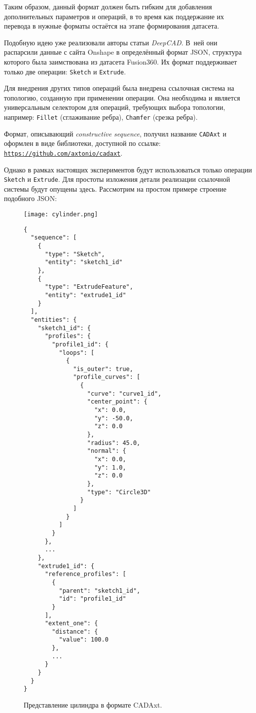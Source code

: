 Таким образом, данный формат должен быть гибким для добавления дополнительных параметров и операций,
в то время как поддержание их перевода в нужные форматы остаётся на этапе формирования датасета.

Подобную идею уже реализовали авторы статьи \textit{DeepCAD}. В~ней они распарсили данные с сайта Onshape в определённый формат JSON,
структура которого была заимствована из датасета Fusion360.
Их формат поддерживает только две операции: \texttt{Sketch} и \texttt{Extrude}.

Для внедрения других типов операций была внедрена ссылочная система на топологию, созданную при применении операции.
Она необходима и является универсальным селектором для операций, требующих выбора топологии, например:
\texttt{Fillet} (сглаживание ребра), \texttt{Chamfer} (срезка ребра).

Формат, описывающий \textit{constructive sequence}, получил название \texttt{CADAxt}
и оформлен в виде библиотеки, доступной по ссылке: \href{https://github.com/axtonio/cadaxt}{\texttt{https://github.com/axtonio/cadaxt}}.

Однако в рамках настоящих экспериментов будут использоваться только операции \texttt{Sketch} и \texttt{Extrude}.
Для простоты изложения детали реализации ссылочной системы будут опущены здесь.
Рассмотрим на простом примере строение подобного JSON:

\begin{figure}[]
    \centering
    \begin{minipage}[]{0.4\textwidth}
        \centering
        \texttt{[image: cylinder.png]}
    \end{minipage}
    \hfill
    \begin{minipage}[]{0.5\textwidth}
        \centering
        \footnotesize
        \begin{verbatim}
{
  "sequence": [
    {
      "type": "Sketch",
      "entity": "sketch1_id"
    },
    {
      "type": "ExtrudeFeature",
      "entity": "extrude1_id"
    }
  ],
  "entities": {
    "sketch1_id": {
      "profiles": {
        "profile1_id": {
          "loops": [
            {
              "is_outer": true,
              "profile_curves": [
                {
                  "curve": "curve1_id",
                  "center_point": {
                    "x": 0.0,
                    "y": -50.0,
                    "z": 0.0
                  },
                  "radius": 45.0,
                  "normal": {
                    "x": 0.0,
                    "y": 1.0,
                    "z": 0.0
                  },
                  "type": "Circle3D"
                }
              ]
            }
          ]
        }
      },
      ...
    },
    "extrude1_id": {
      "reference_profiles": [
        {
          "parent": "sketch1_id",
          "id": "profile1_id"
        }
      ],
      "extent_one": {
        "distance": {
          "value": 100.0
        },
        ...
      }
    }
  }
}
\end{verbatim}
    \end{minipage}
    \caption{Представление цилиндра в формате CADAxt.}
\end{figure}

